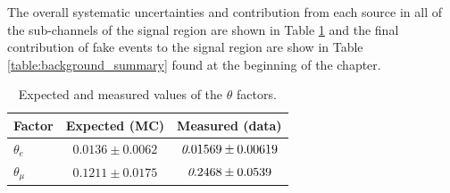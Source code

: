The overall systematic uncertainties and contribution from each source in all of the sub-channels of the signal region are shown in Table \ref{table:background_theta}
and the final contribution of fake events to the signal region are show in Table \ref{table:background_summary} found at the beginning of the chapter.  
\begin{table}
\begin{center}
{\small \begin{tabular}{ l c c }
\hline Factor    &  Expected (MC) & Measured (data) \\ \hline
 $\theta_e$   & $0.0136\pm0.0062$  & ${\it 0.01569\pm0.00619}$  \\ 
 $\theta_{\mu}$  & $0.1211\pm0.0175$ & ${\it 0.2468 \pm 0.0539}$ \\\hline%
\end{tabular}}
\caption{ Expected and measured values of the $\theta$ factors. \label{table:background_theta}} 
\end{center}

\end{table}


